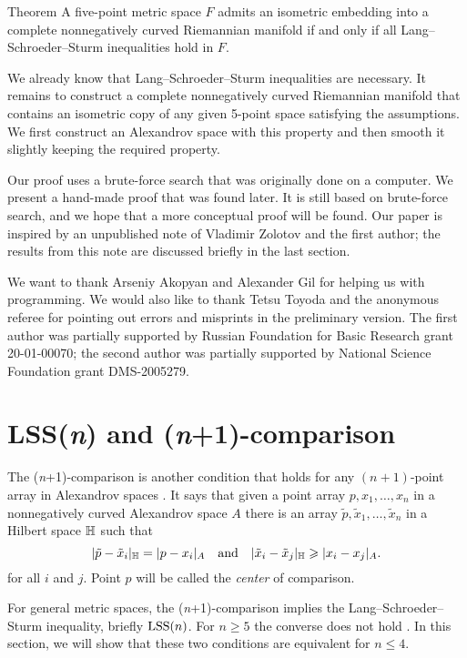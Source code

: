 \documentclass{article}
\begin{document}
\begin{thm}{Theorem}\label{thm:main}
A five-point metric space $F$ admits an isometric embedding into a complete nonnegatively curved Riemannian manifold
if and only if all Lang--Schroeder--Sturm inequalities hold in $F$.
\end{thm}

We already know that Lang--Schroeder--Sturm inequalities are necessary.
It remains to construct a complete nonnegatively curved Riemannian manifold that contains an isometric copy of any given 5-point space satisfying the assumptions.
We first construct an Alexandrov space with this property and then smooth it slightly keeping the required property.

Our proof uses a brute-force search that was originally done on a computer.
We present a hand-made proof that was found later.
It is still based on brute-force search, and we hope that a more conceptual proof will be found.
Our paper is inspired by an unpublished note of Vladimir Zolotov and the first author;
the results from this note are discussed briefly in the last section.

We want to thank Arseniy Akopyan and Alexander Gil for helping us with programming.
We would also like to thank Tetsu Toyoda and the anonymous referee for pointing out errors and misprints in the preliminary version.
The first author was partially supported by Russian Foundation for Basic Research grant 20-01-00070; 
the second author was partially supported by National Science Foundation grant DMS-2005279.

\section{LSS(\textit{n}) and (\textit{n}+1)-comparison}


The (\textit{n}+1)-comparison is another condition that holds for any $(n+1)$-point array in  Alexandrov spaces \cite{alexander2019alexandrov,AKP-Kirszbraun}.
It says that given a point array $p,x_1,\dots,x_n$ in a nonnegatively curved Alexandrov space $A$ 
there is an array $\tilde p,\tilde x_1,\dots,\tilde x_n$ in a Hilbert space $\mathbb H$ such that 
\[
|\tilde p-\tilde x_i|_{\mathbb H}=|p-x_i|_{A}
\quad
\text{and}
\quad
|\tilde x_i-\tilde x_j|_{\mathbb H}\geqslant |x_i-x_j|_{A}.
\]
for all $i$ and $j$.
Point $p$ will be called the \emph{center} of comparison.

For general metric spaces, the (\textit{n}+1)-comparison implies the Lang--Schroeder--Sturm inequality,  briefly $\mathrm{LSS}(n)$.
For $n\ge 5$ the converse does not hold \cite[Section 8]{lebedeva-petrunin-zolotov}.
In this section, we will show that these two conditions are equivalent for $n\le 4$.
\end{document}
